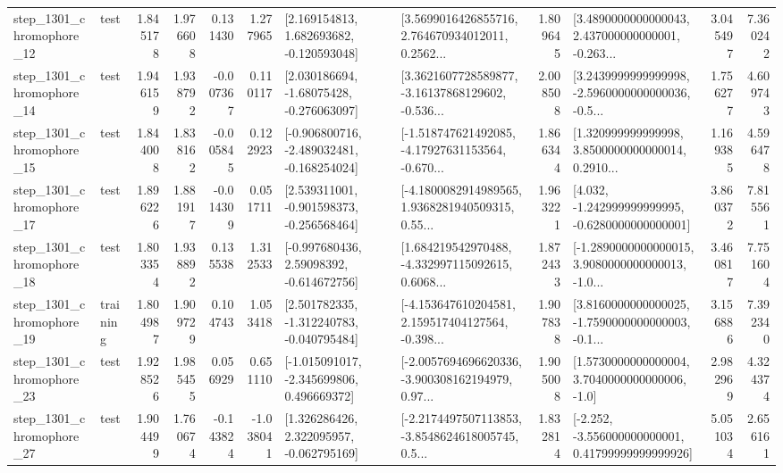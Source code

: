 \begin{tabular}{llrrrrllrlrr}
 step\_1301\_chromophore\_12 &      test &      1.845178 &    1.976608 &      0.131430 &  1.277965 &    [2.169154813, 1.682693682, -0.120593048] &  [3.5699016426855716, 2.764670934012011, 0.2562... &       1.809645 &  [3.4890000000000043, 2.437000000000001, -0.263... &            3.045497 &          7.360242 \\
 step\_1301\_chromophore\_14 &      test &      1.946159 &    1.938792 &     -0.007367 &  0.110117 &    [2.030186694, -1.68075428, -0.276063097] &  [3.3621607728589877, -3.16137868129602, -0.536... &       2.008508 &  [3.2439999999999998, -2.5960000000000036, -0.5... &            1.756277 &          4.609743 \\
 step\_1301\_chromophore\_15 &      test &      1.844008 &    1.838162 &     -0.005845 &  0.122923 &  [-0.906800716, -2.489032481, -0.168254024] &  [-1.518747621492085, -4.17927631153564, -0.670... &       1.866344 &  [1.320999999999998, 3.8500000000000014, 0.2910... &            1.169385 &          4.596478 \\
 step\_1301\_chromophore\_17 &      test &      1.896226 &    1.881917 &     -0.014309 &  0.051711 &   [2.539311001, -0.901598373, -0.256568464] &  [-4.1800082914989565, 1.9368281940509315, 0.55... &       1.963221 &   [4.032, -1.242999999999995, -0.6280000000000001] &            3.860372 &          7.815561 \\
 step\_1301\_chromophore\_18 &      test &      1.803354 &    1.938892 &      0.135538 &  1.312533 &    [-0.997680436, 2.59098392, -0.614672756] &  [1.684219542970488, -4.332997115092615, 0.6068... &       1.872433 &  [-1.2890000000000015, 3.9080000000000013, -1.0... &            3.460817 &          7.751604 \\
 step\_1301\_chromophore\_19 &  training &      1.804987 &    1.909729 &      0.104743 &  1.053418 &   [2.501782335, -1.312240783, -0.040795484] &  [-4.153647610204581, 2.159517404127564, -0.398... &       1.907838 &  [3.8160000000000025, -1.7590000000000003, -0.1... &            3.156886 &          7.392340 \\
 step\_1301\_chromophore\_23 &      test &      1.928526 &    1.985455 &      0.056929 &  0.651110 &   [-1.015091017, -2.345699806, 0.496669372] &  [-2.0057694696620336, -3.900308162194979, 0.97... &       1.905008 &     [1.5730000000000004, 3.7040000000000006, -1.0] &            2.982969 &          4.324374 \\
 step\_1301\_chromophore\_27 &      test &      1.904499 &    1.760674 &     -0.143824 & -1.038041 &    [1.326286426, 2.322095957, -0.062795169] &  [-2.2174497507113853, -3.8548624618005745, 0.5... &       1.832814 &  [-2.252, -3.556000000000001, 0.41799999999999926] &            5.051034 &          2.656161 \\

\end{tabular}
